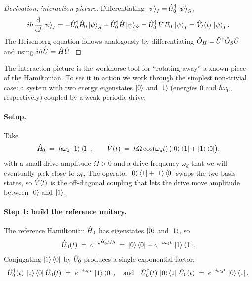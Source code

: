 \begin{proof}[Derivation, interaction picture]
Differentiating $\ket{\psi}_I=\hat{U}_0^\dagger\ket{\psi}_S$,
\begin{equation}
i\hbar\,\dv{t}\ket{\psi}_I
= -\hat{U}_0^\dagger\hat{H}_0\ket{\psi}_S
+ \hat{U}_0^\dagger\hat{H}\ket{\psi}_S
= \hat{U}_0^\dagger\,\hat{V}\,\hat{U}_0\,\ket{\psi}_I
= \hat{V}_I(t)\,\ket{\psi}_I.
\end{equation}
The Heisenberg equation follows analogously by differentiating
$\hat{O}_H=\hat{U}^\dagger\hat{O}_S\hat{U}$ and using
$i\hbar\,\dot{\hat{U}}=\hat{H}\hat{U}$.
\end{proof}

\begin{example}
\label{ex:tls-rotating-frame}
The interaction picture is the workhorse tool for ``rotating away''
a known piece of the Hamiltonian. To see it in action we work
through the simplest non-trivial case: a system with two energy
eigenstates $\ket{0}$ and $\ket{1}$ (energies $0$ and $\hbar\omega_0$,
respectively) coupled by a weak periodic drive.

\paragraph{Setup.}
Take
\begin{equation}
\hat{H}_0 \;=\; \hbar\omega_0\,\ket{1}\bra{1},
\qquad
\hat{V}(t) \;=\; \hbar\Omega\cos(\omega_d t)\,
\bigl(\ket{0}\bra{1}+\ket{1}\bra{0}\bigr),
\end{equation}
with a small drive amplitude $\Omega>0$ and a drive frequency
$\omega_d$ that we will eventually pick close to $\omega_0$. The
operator $\ket{0}\bra{1}+\ket{1}\bra{0}$ swaps the two basis states,
so $\hat{V}(t)$ is the off-diagonal coupling that lets the drive move
amplitude between $\ket{0}$ and $\ket{1}$.

\paragraph{Step 1: build the reference unitary.}
The reference Hamiltonian $\hat{H}_0$ has eigenstates $\ket{0}$ and
$\ket{1}$, so
\begin{equation}
\hat{U}_0(t) \;=\; e^{-i\hat{H}_0 t/\hbar}
\;=\; \ket{0}\bra{0} + e^{-i\omega_0 t}\,\ket{1}\bra{1}.
\end{equation}
Conjugating $\ket{1}\bra{0}$ by $\hat{U}_0$ produces a single
exponential factor:
\begin{equation}
\hat{U}_0^\dagger(t)\,\ket{1}\bra{0}\,\hat{U}_0(t)
\;=\; e^{+i\omega_0 t}\,\ket{1}\bra{0},
\quad\text{and}\quad
\hat{U}_0^\dagger(t)\,\ket{0}\bra{1}\,\hat{U}_0(t)
\;=\; e^{-i\omega_0 t}\,\ket{0}\bra{1}.
\end{equation}


\end{example}
